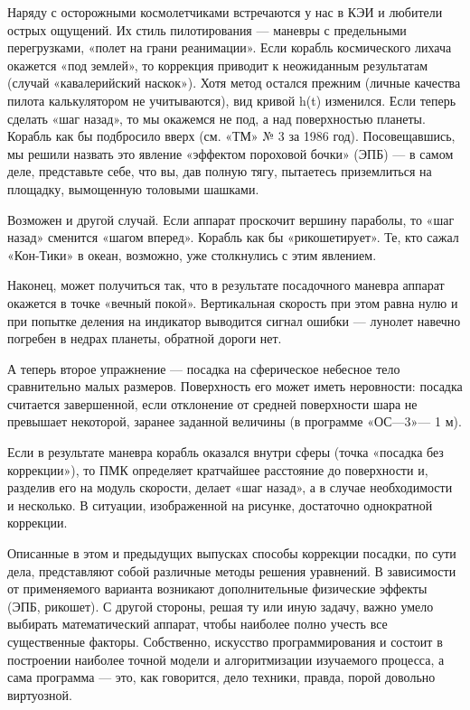 \documentclass[11pt,a4paper,oneside]{article}
\begin{document}
Наряду с осторожными космолетчиками встречаются у нас в КЭИ и любители острых ощущений. Их стиль пилотирования — маневры с предельными перегрузками, «полет на грани реанимации». Если корабль космического лихача окажется «под землей», то коррекция приводит к неожиданным результатам (случай «кавалерийский наскок»). Хотя метод остался прежним (личные качества пилота калькулятором не учитываются), вид кривой h(t) изменился. Если теперь сделать «шаг назад», то мы окажемся не под, а над поверхностью планеты. Корабль как бы подбросило вверх (см. «ТМ» № 3 за 1986 год). Посовещавшись, мы решили назвать это явление «эффектом пороховой бочки» (ЭПБ) — в самом деле, представьте себе, что вы, дав полную тягу, пытаетесь приземлиться на площадку, вымощенную толовыми шашками.

Возможен и другой случай. Если аппарат проскочит вершину параболы, то «шаг назад» сменится «шагом вперед». Корабль как бы «рикошетирует». Те, кто сажал «Кон-Тики» в океан, возможно, уже столкнулись с этим явлением.

Наконец, может получиться так, что в результате посадочного маневра аппарат окажется в точке «вечный покой». Вертикальная скорость при этом равна нулю и при попытке деления на индикатор выводится сигнал ошибки — лунолет навечно погребен в недрах планеты, обратной дороги нет.

А теперь второе упражнение — посадка на сферическое небесное тело сравнительно малых размеров. Поверхность его может иметь неровности: посадка считается завершенной, если отклонение от средней поверхности шара не превышает некоторой, заранее заданной величины (в программе «ОС—3»— 1 м).

Если в результате маневра корабль оказался внутри сферы (точка «посадка без коррекции»), то ПМК определяет кратчайшее расстояние до поверхности и, разделив его на модуль скорости, делает «шаг назад», а в случае необходимости и несколько. В ситуации, изображенной на рисунке, достаточно однократной коррекции.

Описанные в этом и предыдущих выпусках способы коррекции посадки, по сути дела, представляют собой различные методы решения уравнений. В зависимости от применяемого варианта возникают дополнительные физические эффекты (ЭПБ, рикошет). С другой стороны, решая ту или иную задачу, важно умело выбирать математический аппарат, чтобы наиболее полно учесть все существенные факторы. Собственно, искусство программирования и состоит в построении наиболее точной модели и алгоритмизации изучаемого процесса, а сама программа — это, как говорится, дело техники, правда, порой довольно виртуозной.
\end{document}
